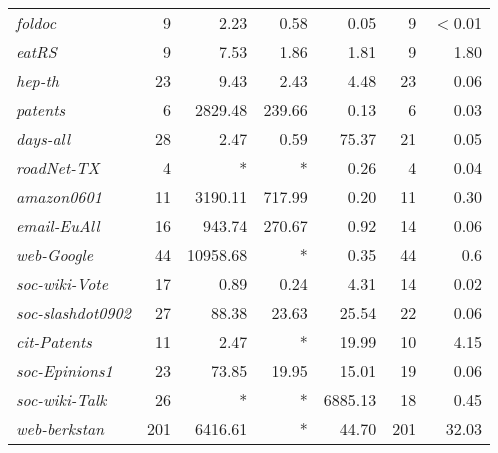 \begin{table}[tbh]
\begin{tabular}{lr|rrr|rr}
{\it foldoc}	&	9	&	2.23	&	0.58	&	0.05	&	9	&	$<$0.01	\\
{\it eatRS}	&	9	&	7.53	&	1.86	&	1.81	&	9	&	1.80	\\
{\it hep-th}	&	23	&	9.43	&	2.43	&	4.48	&	23	&	0.06	\\
{\it patents}	&	6	&	2829.48	&	239.66	&	0.13	&	6	&	0.03	\\
{\it days-all}	&	28	&	2.47	&	0.59	&	75.37	&	21	&	0.05	\\
{\it roadNet-TX}	&	4	&	*	&	*	&	0.26	&	4	&	0.04	\\
{\it amazon0601}	&	11	&	3190.11	&	717.99	&	0.20	&	11	&	0.30	\\
{\it email-EuAll}	&	16	&	943.74	&	270.67	&	0.92	&	14	&	0.06	\\
{\it web-Google}	&	44	&	10958.68	&	*	&	0.35	&	44	&	0.6	\\
{\it soc-wiki-Vote}	&	17	&	0.89	&	0.24	&	4.31	&	14	&	0.02	\\
{\it soc-slashdot0902}	&	27	&	88.38	&	23.63	&	25.54	&	22	&	0.06	\\
{\it cit-Patents}	&	11	&	2.47	&	*	&	19.99	&	10	&	4.15	\\
{\it soc-Epinions1}	&	23	&	73.85	&	19.95	&	15.01	&	19	&	0.06	\\
{\it soc-wiki-Talk}	&	26	&	*	&	*	&	6885.13	&	18	&	0.45	\\
{\it web-berkstan}	&	201	&	6416.61	&	*	&	44.70	&	201	&	32.03	\\
	\bottomrule\bottomrule
\end{tabular}
\end{table}
